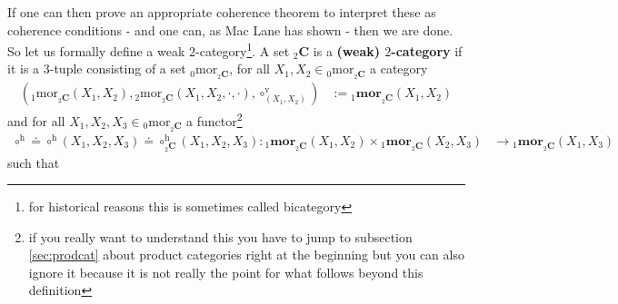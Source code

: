 If one can then prove an appropriate coherence theorem to interpret these as coherence conditions - and one can, as Mac Lane has shown - then we are done.
So let us formally define a weak $2$-category\footnote{for historical reasons this is sometimes called bicategory}.
A set ${}_{2}\mathbf{C}$ is a \textbf{(weak) $2$-category} if it is a $3$-tuple consisting of a set ${}_{0}\mathrm{mor}_{{}_{2}\mathbf{C}}$, for all $X_{1},X_{2} \in {}_{0}\mathrm{mor}_{_{2}\mathbf{C}}$ a category
\begin{align*}
  \left(
    {}_{1}\mathrm{mor}_{{}_{2}\mathbf{C}}(X_{1},X_{2}),
    {}_{2}\mathrm{mor}_{{}_{2}\mathbf{C}}(X_{1},X_{2},\cdot,\cdot),
    \circ_{(X_{1},X_{2})}^{\textrm{v}}
  \right)
  &:=
  {}_{1}\mathbf{mor}_{{}_{2}\mathbf{C}}(X_{1},X_{2})
\end{align*}
and for all $X_{1},X_{2},X_{3} \in {}_{0}\mathrm{mor}_{{}_{2}\mathbf{C}}$ a functor\footnote{if you really want to understand this you have to jump to subsection \ref{sec:prodcat} about product categories right at the beginning but you can also ignore it because it is not really the point for what follows beyond this definition}
\begin{align*}
  \circ^{\textrm{h}}
  \doteq
  \circ^{\textrm{h}}(X_{1},X_{2},X_{3})
  \doteq
  \circ_{{}_{2}{\mathbf{C}}}^{\textrm{h}}(X_{1},X_{2},X_{3})
  \colon
  {}_{1}\mathbf{mor}_{{}_{2}\mathbf{C}}(X_{1},X_{2})
  \times
  {}_{1}\mathbf{mor}_{{}_{2}\mathbf{C}}(X_{2},X_{3})
  &\rightarrow
  {}_{1}\mathbf{mor}_{{}_{2}\mathbf{C}}(X_{1},X_{3})
\end{align*}
such that
